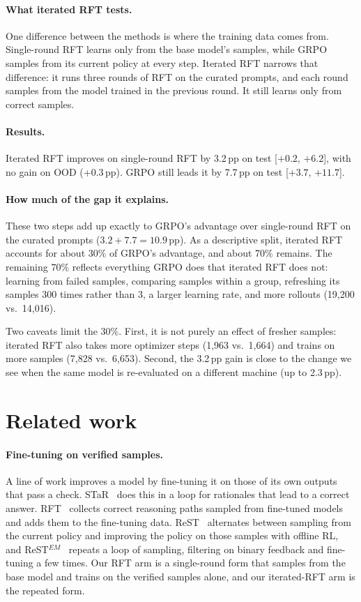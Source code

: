 \documentclass{article}
\begin{document}
\paragraph{What iterated RFT tests.} One difference between the methods is where the training data comes from. Single-round RFT learns only from the base model's samples, while GRPO samples from its current policy at every step. Iterated RFT narrows that difference: it runs three rounds of RFT on the curated prompts, and each round samples from the model trained in the previous round. It still learns only from correct
samples.

\paragraph{Results.} Iterated RFT improves on single-round RFT by 3.2\,pp on test [$+0.2$, $+6.2$], with no gain on OOD (+0.3\,pp). GRPO still leads it by 7.7\,pp on test [$+3.7$, $+11.7$].

\paragraph{How much of the gap it explains.} These two steps add up exactly to GRPO's advantage over single-round RFT on the curated prompts ($3.2 + 7.7 = 10.9$\,pp). As a descriptive split, iterated RFT accounts for about 30\% of GRPO's advantage, and about 70\% remains. The remaining 70\% reflects everything GRPO does that iterated RFT does
not: learning from failed samples, comparing samples within a group, refreshing its samples 300 times rather than 3, a larger learning rate, and more rollouts (19{,}200 vs.\ 14{,}016).

Two caveats limit the 30\%. First, it is not purely an effect of fresher samples: iterated RFT also takes more optimizer steps (1{,}963 vs.\ 1{,}664) and trains on more samples (7{,}828 vs.\ 6{,}653). Second, the 3.2\,pp gain is close to the change we see when the same model is re-evaluated on a different machine (up to 2.3\,pp).

\section{Related work}
\label{sec:related}

\paragraph{Fine-tuning on verified samples.} A line of work improves a model by fine-tuning it on those of its own outputs that pass a check. STaR~\citep{zelikman2022star} does this in a loop for rationales that lead to a correct answer. RFT~\citep{yuan2023scaling} collects correct reasoning paths sampled from fine-tuned models and adds them to the fine-tuning data. ReST~\citep{gulcehre2023rest} alternates between sampling from the current policy and improving the policy on those samples with offline RL, and ReST$^{EM}$~\citep{singh2024beyond} repeats a loop of sampling, filtering on binary feedback and fine-tuning a few times. Our RFT arm is a single-round form that samples from the base model and trains on the verified samples alone, and our iterated-RFT arm is the repeated form.
\end{document}

